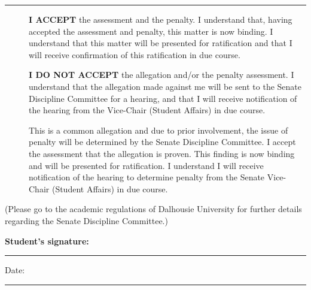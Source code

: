 \documentclass[10pt]{dalcsletter}
\begin{document}
\vspace*{0em}
\noindent \rule{\linewidth}{5pt}
\vspace*{-0.5em}
\begin{description}
\item[\fbox{\rule[1em]{1em}{0pt}}] {\bf I ACCEPT} the assessment and 
     the penalty. I understand that, having accepted the assessment
     and penalty, this matter is now binding. I understand that
     this matter will be presented for ratification and that I will
     receive confirmation of this ratification in due course.

\item[\fbox{\rule[1em]{1em}{0pt}}] {\bf I DO NOT ACCEPT} the allegation
     and/or the penalty assessment. I understand that the allegation
     made against me will be sent to the Senate Discipline Committee
     for a hearing, and that I will receive notification of the
     hearing from the Vice-Chair (Student Affairs) in due course.

\item[\fbox{\rule[1em]{1em}{0pt}}] This is a common allegation and
     due to prior involvement, the issue of penalty will be determined
     by the Senate Discipline Committee. I accept the assessment that
     the allegation is proven. This finding is now binding and will be
     presented for ratification. I understand I will receive notification
     of the hearing to determine penalty from the Senate Vice-Chair
     (Student Affairs) in due course.
\end{description}

\noindent (Please go to the academic regulations of Dalhousie
University for further details regarding the Senate Discipline
Committee.)

{\large\bf
  \noindent Student's signature: \rule{40ex}{1pt} Date: \rule{15ex}{1pt}
}
\end{document}
